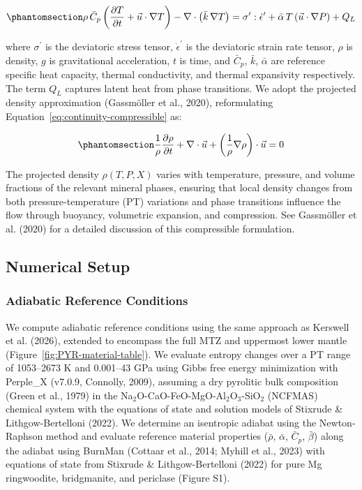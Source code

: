 \documentclass[draft,linenumbers]{agujournal2019}
\begin{document}
\begin{equation}\protect\phantomsection\label{eq:energy}{
  \rho\, \bar{C}_p \left(\frac{\partial T}{\partial t} + \vec{u} \cdot \nabla T \right) - \nabla \cdot \left(\bar{k}\, \nabla T \right) = \sigma^{\prime} : \dot{\epsilon}^{\prime} + \bar{\alpha}\, T \left(\vec{u} \cdot \nabla P \right) + Q_L
}\end{equation}

where \(\sigma^{\prime}\) is the deviatoric stress tensor,
\(\dot{\epsilon}^{\prime}\) is the deviatoric strain rate tensor,
\(\rho\) is density, \(g\) is gravitational acceleration, \(t\) is time,
and \(\bar{C}_p\), \(\bar{k}\), \(\bar{\alpha}\) are reference specific
heat capacity, thermal conductivity, and thermal expansivity
respectively. The term \(Q_L\) captures latent heat from phase
transitions. We adopt the projected density approximation (Gassmöller et
al., 2020), reformulating Equation~\ref{eq:continuity-compressible} as:

\begin{equation}\protect\phantomsection\label{eq:continuity-expanded}{
  \frac{1}{\rho} \frac{\partial \rho}{\partial t} + \nabla \cdot \vec{u} + \left(\frac{1}{\rho} \nabla \rho \right) \cdot \vec{u} = 0
}\end{equation}

The projected density \(\rho(T, P, X)\) varies with temperature,
pressure, and volume fractions of the relevant mineral phases, ensuring
that local density changes from both pressure-temperature (PT)
variations and phase transitions influence the flow through buoyancy,
volumetric expansion, and compression. See Gassmöller et al. (2020) for
a detailed discussion of this compressible formulation.

\subsection{Numerical Setup}\label{sec:numerical-setup}

\subsubsection{Adiabatic Reference
Conditions}\label{sec:adiabatic-reference-conditions}

We compute adiabatic reference conditions using the same approach as
Kerswell et al. (2026), extended to encompass the full MTZ and uppermost
lower mantle (Figure~\ref{fig:PYR-material-table}). We evaluate entropy
changes over a PT range of 1053--2673 K and 0.001--43 GPa using Gibbs
free energy minimization with Perple\_X (v7.0.9, Connolly, 2009),
assuming a dry pyrolitic bulk composition (Green et al., 1979) in the
Na\(_2\)O-CaO-FeO-MgO-Al\(_2\)O\(_3\)-SiO\(_2\) (NCFMAS) chemical system
with the equations of state and solution models of Stixrude \&
Lithgow-Bertelloni (2022). We determine an isentropic adiabat using the
Newton-Raphson method and evaluate reference material properties
(\(\bar{\rho}\), \(\bar{\alpha}\), \(\bar{C}_p\), \(\bar{\beta}\)) along
the adiabat using BurnMan (Cottaar et al., 2014; Myhill et al., 2023)
with equations of state from Stixrude \& Lithgow-Bertelloni (2022) for
pure Mg ringwoodite, bridgmanite, and periclase (Figure S1).
\end{document}
